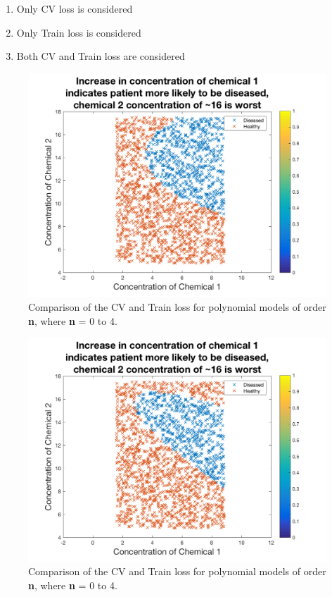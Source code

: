{{	\begin{enumerate}
		\item Only CV loss is considered
		\item Only Train loss is considered
		\item Both CV and Train loss are considered
	\end{enumerate}
	
	\begin{figure}[h]
		\centering
		\includegraphics[width=0.8\linewidth]{images/MAPnewData}
		\caption{Comparison of the CV and Train loss for polynomial models of order \textbf{n}, where \textbf{n} = 0 to 4.}
		\label{fig:CVT4}
	\end{figure}
	
	\begin{figure}[h]
		\centering
		\includegraphics[width=0.8\linewidth]{images/MAPWONnewData}
		\caption{Comparison of the CV and Train loss for polynomial models of order \textbf{n}, where \textbf{n} = 0 to 4.}
		\label{fig:CVT4}
	\end{figure}
	
}}
